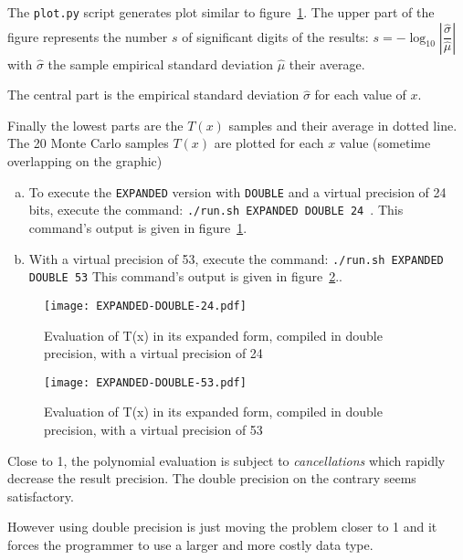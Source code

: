 The \texttt{plot.py} script generates plot similar to
figure~\ref{fig:expanded:double:24}.
The upper part of the figure represents the number $s$ of significant digits of the results: $s=-\log_{10}\left|\dfrac{\hat\sigma}{\hat\mu}\right|$ with $\hat\sigma$ the sample empirical standard deviation  $\hat\mu$ their average.


The central part is the empirical standard deviation $\hat\sigma$ for each value of $x$.

Finally the lowest parts are the $T(x)$ samples and their average in dotted line. The 20 Monte Carlo samples $T(x)$ are plotted for each $x$ value (sometime overlapping on the graphic)

\begin{question}
\begin{enumerate}[(a)]
\item To execute the {\tt EXPANDED} version with {\tt DOUBLE} and a virtual precision of 24 bits, execute the command: {\tt ./run.sh EXPANDED
      DOUBLE 24 }. \newline This command's output is given in figure~\ref{fig:expanded:double:24}.
  \item With a virtual precision of 53, execute the command: {\tt ./run.sh EXPANDED DOUBLE 53} \newline
  This command's output is given in figure~\ref{fig:expanded:double:53}..
  \end{enumerate}
\end{question}

\begin{figure}[h]
\center \texttt{[image: EXPANDED-DOUBLE-24.pdf]}
  \caption{Evaluation of T(x) in its expanded form, compiled in double precision, with a virtual precision of 24}
  \label{fig:expanded:double:24}
\end{figure}
\begin{figure}[h]
\center \texttt{[image: EXPANDED-DOUBLE-53.pdf]}
  \caption{Evaluation of T(x) in its expanded form, compiled in double precision, with a virtual precision of 53}
  \label{fig:expanded:double:53}
\end{figure}

Close to 1, the polynomial evaluation is subject to {\it cancellations} which rapidly decrease the result precision. The double precision on the contrary seems satisfactory.

However using double precision is just moving the problem closer to 1 and it forces the programmer to use a larger and more costly data type.

